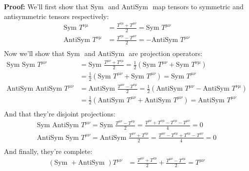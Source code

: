 \documentclass[12pt]{article}
\theoremstyle{definition}
\newcommand{\sym}{\text{Sym }}
\newcommand{\antisym}{\text{AntiSym }}
\begin{document}
\textbf{Proof:}
We'll first show that $\sym$ and $\antisym$ map tensors to symmetric and antisymmetric tensors respectively:
\begin{equation*}
\begin{split}
    \sym T^{\nu\mu} &= \frac{T^{\nu\mu} + T^{\mu\nu}}{2} = \sym T^{\mu\nu} \\
    \antisym T^{\nu\mu} &= \frac{T^{\nu\mu} - T^{\mu\nu}}{2} = - \antisym T^{\mu\nu} \\
\end{split}
\end{equation*}
Now we'll show that $\sym$ and $\antisym$ are projection operators:
\begin{equation*}
\begin{split}
    \sym \sym T^{\mu\nu} &= \sym \frac{T^{\mu\nu} + T^{\nu\mu}}{2} = \frac{1}{2} \left( \sym T^{\mu\nu} + \sym T^{\nu\mu} \right) \\
        &= \frac{1}{2} \left( \sym T^{\mu\nu} + \sym T^{\mu\nu} \right) = \sym T^{\mu\nu} \\
    \antisym \antisym T^{\mu\nu} &= \antisym \frac{T^{\mu\nu} - T^{\nu\mu}}{2} = \frac{1}{2} \left( \antisym T^{\mu\nu} - \antisym T^{\nu\mu} \right) \\
        &= \frac{1}{2} \left( \antisym T^{\mu\nu} + \antisym T^{\mu\nu} \right) = \antisym T^{\mu\nu} \\
\end{split}
\end{equation*}
And that they're disjoint projections:
\begin{equation*}
\begin{split}
    \sym \antisym T^{\mu\nu} = \sym \frac{T^{\mu\nu} - T^{\nu\mu}}{2} = \frac{T^{\mu\nu} + T^{\nu\mu} - T^{\nu\mu} - T^{\mu\nu}}{4} = 0 \\
    \antisym \sym T^{\mu\nu} = \antisym \frac{T^{\mu\nu} + T^{\nu\mu}}{2} = \frac{T^{\mu\nu} - T^{\nu\mu} + T^{\nu\mu} - T^{\mu\nu}}{4} = 0 \\
\end{split}
\end{equation*}
And finally, they're complete:
\begin{equation*}
\begin{split}
    (\sym + \antisym) T^{\mu\nu}
        &= \frac{T^{\mu\nu} + T^{\nu\mu}}{2} + \frac{T^{\mu\nu} - T^{\nu\mu}}{2} = T^{\mu\nu} \\
\end{split}
\end{equation*}
\end{document}
